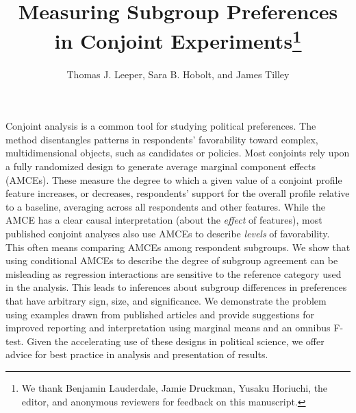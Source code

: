\documentclass[a4paper,12pt]{article}\usepackage[]{graphicx}\usepackage[]{color}
\title{Measuring Subgroup Preferences in Conjoint Experiments\footnote{We thank Benjamin Lauderdale, Jamie Druckman, Yusaku Horiuchi, the editor, and anonymous reviewers for feedback on this manuscript.}}
\author{Thomas J. Leeper, Sara B. Hobolt, and James Tilley}
\begin{document}
\maketitle

{\abstract Conjoint analysis is a common tool for studying political preferences. The method disentangles patterns in respondents' favorability toward complex, multidimensional objects, such as candidates or policies. Most conjoints rely upon a fully randomized design to generate average marginal component effects (AMCEs). These measure the degree to which a given value of a conjoint profile feature increases, or decreases, respondents' support for the overall profile relative to a baseline, averaging across all respondents and other features. While the AMCE has a clear causal interpretation (about the \textit{effect} of features), most published conjoint analyses also use AMCEs to describe \textit{levels} of favorability. This often means comparing AMCEs among respondent subgroups. We show that using conditional AMCEs to describe the degree of subgroup agreement can be misleading as regression interactions are sensitive to the reference category used in the analysis. This leads to inferences about subgroup differences in preferences that have arbitrary sign, size, and significance. We demonstrate the problem using examples drawn from published articles and provide suggestions for improved reporting and interpretation using marginal means and an omnibus F-test. Given the accelerating use of these designs in political science, we offer advice for best practice in analysis and presentation of results.}
















\clearpage
\doublespacing
\end{document}
